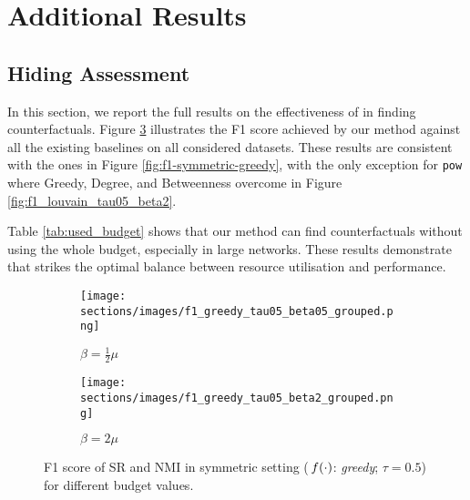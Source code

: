 \section{Additional Results}

\subsection{Hiding Assessment}
\label{app:hiding}
In this section, we report the full results on the effectiveness of \method{} in finding counterfactuals. Figure \ref{fig:f1-comparison} illustrates the F1 score achieved by our method against all the existing baselines on all considered datasets. These results are consistent with the ones in Figure \ref{fig:f1-symmetric-greedy}, with the only exception for \texttt{pow} where Greedy, Degree, and Betweenness overcome \method{} in Figure \ref{fig:f1_louvain_tau05_beta2}.

Table \ref{tab:used_budget} shows that our method can find counterfactuals without using the whole budget, especially in large networks. These results demonstrate that \method{} strikes the optimal balance between resource utilisation and performance.

\begin{figure}[htpb]
    \centering
    \begin{subfigure}[b]{0.49\linewidth}
        \texttt{[image: sections/images/f1\_greedy\_tau05\_beta05\_grouped.png]}
        \caption{$\beta = \frac{1}{2}\mu$}
        \label{fig:f1_greedy_tau05_beta05}
    \end{subfigure}
    \hfill
    \begin{subfigure}[b]{0.49\linewidth}
        \texttt{[image: sections/images/f1\_greedy\_tau05\_beta2\_grouped.png]} 
        \caption{$\beta=2\mu$}
        \label{fig:f1_greedy_tau05_beta2}
    \end{subfigure}
    \caption{F1 score of SR and NMI in symmetric setting (\,$f(\cdot)$: \textit{greedy}; $\tau=0.5$) for different budget values.}
    \label{fig:f1-comparison}
\end{figure}

